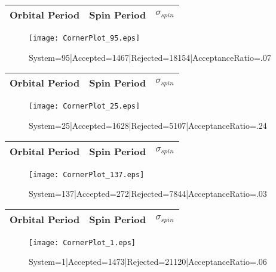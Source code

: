 \documentclass[10pt]{article}
\begin{document}
\begin{center}
        \begin{tabular}{|c|c|c|}
        \hline
Orbital Period & Spin Period & $\sigma_{spin}$ \\
 \hline
        \end{tabular}
        \end{center}
\begin{figure}[h] 
        \texttt{[image: CornerPlot\_95.eps]}
        \caption{System=95|Accepted=1467|Rejected=18154|AcceptanceRatio=.07}
        \label{S95}
        \centering
        \end{figure}
\begin{center}
        \begin{tabular}{|c|c|c|}
        \hline
Orbital Period & Spin Period & $\sigma_{spin}$ \\
 \hline
        \end{tabular}
        \end{center}
\begin{figure}[h] 
        \texttt{[image: CornerPlot\_25.eps]}
        \caption{System=25|Accepted=1628|Rejected=5107|AcceptanceRatio=.24}
        \label{S25}
        \centering
        \end{figure}
\begin{center}
        \begin{tabular}{|c|c|c|}
        \hline
Orbital Period & Spin Period & $\sigma_{spin}$ \\
 \hline
        \end{tabular}
        \end{center}
\begin{figure}[h] 
        \texttt{[image: CornerPlot\_137.eps]}
        \caption{System=137|Accepted=272|Rejected=7844|AcceptanceRatio=.03}
        \label{S137}
        \centering
        \end{figure}
\begin{center}
        \begin{tabular}{|c|c|c|}
        \hline
Orbital Period & Spin Period & $\sigma_{spin}$ \\
 \hline
        \end{tabular}
        \end{center}
\begin{figure}[h] 
        \texttt{[image: CornerPlot\_1.eps]}
        \caption{System=1|Accepted=1473|Rejected=21120|AcceptanceRatio=.06}
        \label{S1}
        \centering
        \end{figure}
\end{document}
